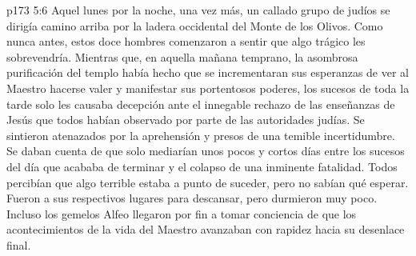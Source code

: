 \vs p173 5:6 Aquel lunes por la noche, una vez más, un callado grupo de judíos se dirigía camino arriba por la ladera occidental del Monte de los Olivos. Como nunca antes, estos doce hombres comenzaron a sentir que algo trágico les sobrevendría. Mientras que, en aquella mañana temprano, la asombrosa purificación del templo había hecho que se incrementaran sus esperanzas de ver al Maestro hacerse valer y manifestar sus portentosos poderes, los sucesos de toda la tarde solo les causaba decepción ante el innegable rechazo de las enseñanzas de Jesús que todos habían observado por parte de las autoridades judías. Se sintieron atenazados por la aprehensión y presos de una temible incertidumbre. Se daban cuenta de que solo mediarían unos pocos y cortos días entre los sucesos del día que acababa de terminar y el colapso de una inminente fatalidad. Todos percibían que algo terrible estaba a punto de suceder, pero no sabían qué esperar. Fueron a sus respectivos lugares para descansar, pero durmieron muy poco. Incluso los gemelos Alfeo llegaron por fin a tomar conciencia de que los acontecimientos de la vida del Maestro avanzaban con rapidez hacia su desenlace final.
